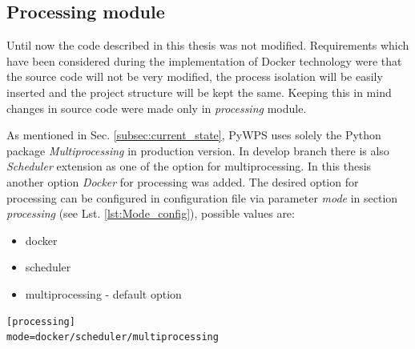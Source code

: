 \documentclass[12pt,a4paper]{article}
\begin{document}
\subsection{Processing module}
Until now the code described in this thesis was not modified. Requirements which have been considered during the implementation of
Docker technology were that the source code will not be very modified, the process isolation will be easily inserted and the project structure will be kept the same. Keeping this in mind changes in source code were made only in \textit{processing} module.

As mentioned in Sec. \ref{subsec:current_state}, PyWPS uses solely the Python package \textit{Multiprocessing} in production version.
In develop branch there is also \textit{Scheduler} extension as one of the option for multiprocessing. In this thesis another option 
\textit{Docker} for processing was added. The desired option for processing can be configured in configuration file via parameter \textit{mode} in section \textit{processing} (see Lst. \ref{lst:Mode_config}), possible values are:
\begin{itemize}
\item docker
\item scheduler
\item multiprocessing - default option
\end{itemize}

\bigskip
\begin{lstlisting}[basicstyle=\small,caption={Processing mode configuration},language=XML,label={lst:Mode_config}]
[processing]
mode=docker/scheduler/multiprocessing
\end{lstlisting}
\end{document}
